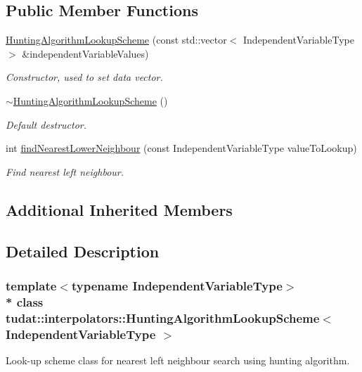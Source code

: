 \subsection*{Public Member Functions}
\begin{DoxyCompactItemize}
\item 
\hyperlink{classtudat_1_1interpolators_1_1HuntingAlgorithmLookupScheme_a3fb7eafeb1f8b9056632e9ccca263da4}{Hunting\+Algorithm\+Lookup\+Scheme} (const std\+::vector$<$ Independent\+Variable\+Type $>$ \&independent\+Variable\+Values)
\begin{DoxyCompactList}\small\item\em Constructor, used to set data vector. \end{DoxyCompactList}\item 
\hyperlink{classtudat_1_1interpolators_1_1HuntingAlgorithmLookupScheme_a45c5e88d66c4c2cfa605f4281ddf04ef}{$\sim$\+Hunting\+Algorithm\+Lookup\+Scheme} ()
\begin{DoxyCompactList}\small\item\em Default destructor. \end{DoxyCompactList}\item 
int \hyperlink{classtudat_1_1interpolators_1_1HuntingAlgorithmLookupScheme_a52750dd9d4c1b1177459ee5630b24451}{find\+Nearest\+Lower\+Neighbour} (const Independent\+Variable\+Type value\+To\+Lookup)
\begin{DoxyCompactList}\small\item\em Find nearest left neighbour. \end{DoxyCompactList}\end{DoxyCompactItemize}
\subsection*{Additional Inherited Members}


\subsection{Detailed Description}
\subsubsection*{template$<$typename Independent\+Variable\+Type$>$\\*
class tudat\+::interpolators\+::\+Hunting\+Algorithm\+Lookup\+Scheme$<$ Independent\+Variable\+Type $>$}

Look-\/up scheme class for nearest left neighbour search using hunting algorithm. 

